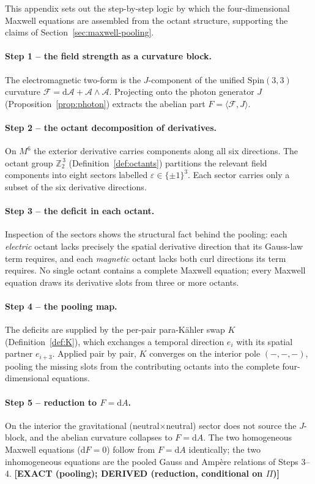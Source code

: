 \documentclass[11pt,oneside]{book}
\newcommand{\Zt}{\mathbb{Z}_2}
\newcommand{\dd}{\mathrm{d}}
\newcommand{\Spin}{\mathrm{Spin}}
\newcommand{\Fcal}{\mathcal{F}}
\newcommand{\Acal}{\mathcal{A}}
\newcommand{\status}[1]{{\sffamily\bfseries\color{statuscol}[#1]}}
\theoremstyle{plain}
\theoremstyle{definition}
\theoremstyle{remark}
\begin{document}
This appendix sets out the step-by-step logic by which the four-dimensional Maxwell
equations are assembled from the octant structure, supporting the claims of
Section~\ref{sec:maxwell-pooling}.

\paragraph{Step 1 -- the field strength as a curvature block.}
The electromagnetic two-form is the $J$-component of the unified $\Spin(3,3)$
curvature $\Fcal=\dd\Acal+\Acal\wedge\Acal$. Projecting onto the photon generator
$J$ (Proposition~\ref{prop:photon}) extracts the abelian part $F=\langle\Fcal,J\rangle$.

\paragraph{Step 2 -- the octant decomposition of derivatives.}
On $M^6$ the exterior derivative carries components along all six directions. The
octant group $\Zt^{\,3}$ (Definition~\ref{def:octants}) partitions the relevant
field components into eight sectors labelled $\varepsilon\in\{\pm1\}^3$. Each sector
carries only a subset of the six derivative directions.

\paragraph{Step 3 -- the deficit in each octant.}
Inspection of the sectors shows the structural fact behind the pooling: each
\emph{electric} octant lacks precisely the spatial derivative direction that its
Gauss-law term requires, and each \emph{magnetic} octant lacks both curl directions
its term requires. No single octant contains a complete Maxwell equation; every
Maxwell equation draws its derivative slots from three or more octants.

\paragraph{Step 4 -- the pooling map.}
The deficits are supplied by the per-pair para-K\"ahler swap $K$
(Definition~\ref{def:K}), which exchanges a temporal direction $e_i$ with its
spatial partner $e_{i+3}$. Applied pair by pair, $K$ converges on the interior pole
$(-,-,-)$, pooling the missing slots from the contributing octants into the complete
four-dimensional equations.

\paragraph{Step 5 -- reduction to $F=\dd A$.}
On the interior the gravitational (neutral$\times$neutral) sector does not source the
$J$-block, and the abelian curvature collapses to $F=\dd A$. The two homogeneous
Maxwell equations ($\dd F=0$) follow from $F=\dd A$ identically; the two inhomogeneous
equations are the pooled Gauss and Amp\`ere relations of Steps 3--4.
\status{EXACT (pooling); DERIVED (reduction, conditional on $\Pi$)}
\end{document}
